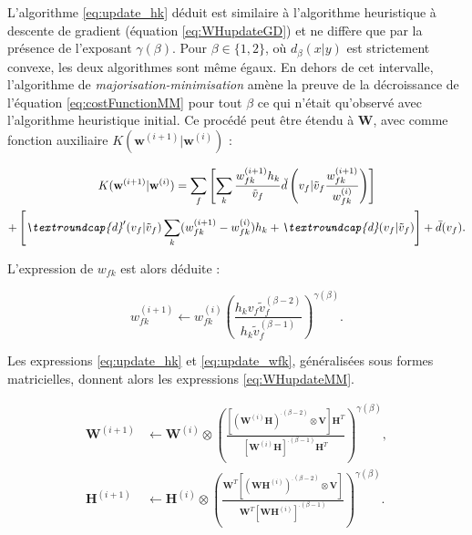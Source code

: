 L'algorithme \ref{eq:update_hk} déduit est similaire à l'algorithme heuristique à descente de gradient (équation \ref{eq:WHupdateGD}) et ne diffère que par la présence de l'exposant $\gamma
(\beta)$. Pour $\beta \in \lbrace 1, 2 \rbrace$, où $d_{\beta}(x\vert y)$ est strictement convexe, les deux algorithmes sont même égaux. En dehors de cet intervalle, l'algorithme de \textit{majorisation-minimisation} amène la preuve de la décroissance de l'équation \ref{eq:costFunctionMM} pour tout $\beta$ ce qui n'était qu'observé avec l'algorithme heuristique initial. Ce procédé peut être étendu à $\mathbf{W}$, avec comme fonction auxiliaire $K(\mathbf{w}^{(i+1)}\vert \mathbf{w}^{(i)})$ :

\begin{multline}\label{eq:derivé-fonc-auxiliaireK}
K(\mathbf{w}^{(i+1)}\vert \mathbf{w}^{(i)}) =\sum_f \left[ \sum_k \frac{w_{fk}^{(i+1)}h_{k}}{\tilde{v}_f} \breve{d}\left(v_f\vert \tilde{v}_f \frac{w_{fk}^{(i+1)}}{w_{fk}^{(i)}} \right) \right]\\+ \left[ \textit{\textroundcap{d}}'(v_f\vert \tilde{v}_f) \sum_k (w_{fk}^{(i+1)}-w_{fk}^{(i)}) h_k+ \textit{\textroundcap{d}}(v_f\vert \tilde{v}_f)\right] +\bar{d}(v_f).
\end{multline}

L'expression de $w_{fk}$ est alors déduite :

\begin{equation}\label{eq:update_wfk}
w_{fk}^{(i+1)} \leftarrow w_{fk}^{(i)}\left( \frac{h_k v_f \tilde{v}_f^{(\beta-2)}}{h_k\tilde{v}_{f}^{(\beta-1)}}\right)^{\gamma(\beta)}.
\end{equation}

Les expressions \ref{eq:update_hk} et \ref{eq:update_wfk}, généralisées sous formes matricielles, donnent alors les expressions \ref{eq:WHupdateMM}.

\begin{subequations}\label{eq:WHupdateMM}
\begin{align}
\textbf{W}^{(i+1)} &\leftarrow \textbf{W}^{(i)}\otimes\left(\frac{\left[\left(\textbf{W}^{(i)}\mathbf{H} \right)^{.(\beta-2)}\otimes\textbf{V} \right]\textbf{H}^T}{\left[\textbf{W}^{(i)}\mathbf{H} \right]^{.(\beta-1)}\textbf{H}^T}\right)^{\gamma(\beta)},\label{eq:WupdateMM}\\
\textbf{H}^{(i+1)} &\leftarrow \textbf{H}^{(i)}\otimes\left(\frac{\textbf{W}^T \left[\left(\textbf{WH}^{(i)} \right)^{.(\beta-2)}\otimes\textbf{V} \right]}{\textbf{W}^T \left[\textbf{WH}^{(i)} \right]^{.(\beta-1)}}\right)^{\gamma(\beta)}.\label{eq:HupdateMM}
\end{align}
\end{subequations}


